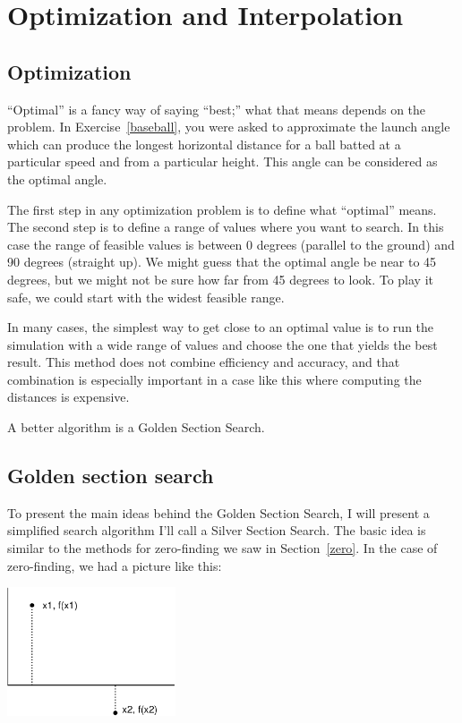\documentclass{book}
\begin{document}
\chapter{Optimization and Interpolation}
\section{Optimization}

``Optimal'' is a fancy way of saying ``best;'' what that means depends on the problem. 
In Exercise~\ref{baseball}, you were asked to approximate the launch angle which
can produce the longest horizontal distance for a ball batted at a particular speed 
and from a particular height.  This angle can be considered as the
optimal angle. 

The first step in any optimization problem is to define
what ``optimal'' means.  The second step is to define a range of
values where you want to search. In this case the range of
feasible values is between 0 degrees (parallel to the ground)
and 90 degrees (straight up).  We might guess that the
optimal angle be near to 45 degrees, but we might not be sure
how far from 45 degrees to look.  To play it safe, we could
start with the widest feasible range.

In many cases, 
the simplest way to get close to an optimal value is to run the
simulation with a wide range of values and choose the one
that yields the best result.  This
method does not combine efficiency and accuracy, 
and that combination is especially important in a case like this where
computing the distances is expensive.

A better algorithm is a Golden Section Search.  

\section{Golden section search}

To present the main ideas behind 
the Golden Section Search, I will present a simplified
search algorithm I'll call a Silver Section Search.  The basic idea is similar to
the methods for zero-finding we saw in Section~\ref{zero}.  In the
case of zero-finding, we had a picture like this:

\beforefig \centerline{\includegraphics[height=1.5in]{figs/secant.eps}}
\end{document}
